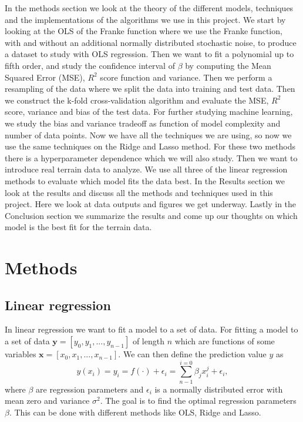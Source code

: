 \documentclass[12pt,a4paper,english]{article}
\begin{document}
In the methods section we look at the theory of the different models, techniques and the implementations of the algorithms we use in this project. We start by looking at the OLS of the Franke function where we use the Franke function, with and without an additional normally distributed stochastic noise, to produce a dataset to study with OLS regression. Then we want to fit a polynomial up to fifth order, and study the confidence interval of $\beta$ by computing the Mean Squared Error (MSE), $R^2$ score function and variance. Then we perform a resampling of the data where we split the data into training and test data. Then we construct the k-fold cross-validation algorithm and evaluate the MSE, $R^2$ score, variance and bias of the test data. For further studying machine learning, we study the bias and variance tradeoff as function of model complexity and number of data points. Now we have all the techniques we are using, so now we use the same techniques on the Ridge and Lasso method. For these two methods there is a hyperparameter dependence which we will also study. Then we want to introduce real terrain data to analyze. We use all three of the linear regression methods to evaluate which model fits the data best. In the Results section we look at the results and discuss all the methods and techniques used in this project. Here we look at data outputs and figures we get underway. Lastly in the Conclusion section we summarize the results and come up our thoughts on which model is the best fit for the terrain data.

\section{Methods}
\subsection{Linear regression}
In linear regression we want to fit a model to a set of data. For fitting a model to a set of data $\textbf{y}=[y_0, y_1,...,y_{n-1}]$ of length $n$ which are functions of some variables $\textbf{x}=[x_0, x_1,...,x_{n-1}]$. We can then define the prediction value $y$ as
\begin{equation}
\label{eq:pred_y}
y(x_i)=y_i=f(\cdot)+\epsilon_i=\sum_{n-1}^{i=0}\beta_jx_i^j+\epsilon_i,
\end{equation}
where $\beta$ are regression parameters and $\epsilon_i$ is a normally distributed error with mean zero and variance $\sigma^2$. The goal is to find the optimal regression parameters $\beta$. This can be done with different methods like OLS, Ridge and Lasso.
\end{document}
